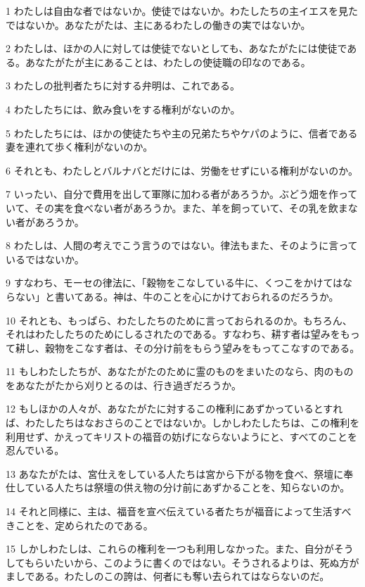 \par 1 わたしは自由な者ではないか。使徒ではないか。わたしたちの主イエスを見たではないか。あなたがたは、主にあるわたしの働きの実ではないか。
\par 2 わたしは、ほかの人に対しては使徒でないとしても、あなたがたには使徒である。あなたがたが主にあることは、わたしの使徒職の印なのである。
\par 3 わたしの批判者たちに対する弁明は、これである。
\par 4 わたしたちには、飲み食いをする権利がないのか。
\par 5 わたしたちには、ほかの使徒たちや主の兄弟たちやケパのように、信者である妻を連れて歩く権利がないのか。
\par 6 それとも、わたしとバルナバとだけには、労働をせずにいる権利がないのか。
\par 7 いったい、自分で費用を出して軍隊に加わる者があろうか。ぶどう畑を作っていて、その実を食べない者があろうか。また、羊を飼っていて、その乳を飲まない者があろうか。
\par 8 わたしは、人間の考えでこう言うのではない。律法もまた、そのように言っているではないか。
\par 9 すなわち、モーセの律法に、「穀物をこなしている牛に、くつこをかけてはならない」と書いてある。神は、牛のことを心にかけておられるのだろうか。
\par 10 それとも、もっぱら、わたしたちのために言っておられるのか。もちろん、それはわたしたちのためにしるされたのである。すなわち、耕す者は望みをもって耕し、穀物をこなす者は、その分け前をもらう望みをもってこなすのである。
\par 11 もしわたしたちが、あなたがたのために霊のものをまいたのなら、肉のものをあなたがたから刈りとるのは、行き過ぎだろうか。
\par 12 もしほかの人々が、あなたがたに対するこの権利にあずかっているとすれば、わたしたちはなおさらのことではないか。しかしわたしたちは、この権利を利用せず、かえってキリストの福音の妨げにならないようにと、すべてのことを忍んでいる。
\par 13 あなたがたは、宮仕えをしている人たちは宮から下がる物を食べ、祭壇に奉仕している人たちは祭壇の供え物の分け前にあずかることを、知らないのか。
\par 14 それと同様に、主は、福音を宣べ伝えている者たちが福音によって生活すべきことを、定められたのである。
\par 15 しかしわたしは、これらの権利を一つも利用しなかった。また、自分がそうしてもらいたいから、このように書くのではない。そうされるよりは、死ぬ方がましである。わたしのこの誇は、何者にも奪い去られてはならないのだ。
